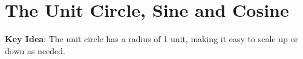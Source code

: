 \documentclass[main]{subfiles}
\begin{document}
\ifSubfilesClassLoaded{%
  \chaptermark{\chaptertwo}
}{}

\section{The Unit Circle, Sine and Cosine} \label{ws2-2}










\textbf{Key Idea}: The unit circle has a radius of 1 unit, making it easy to scale up or down as needed.
\end{document}
